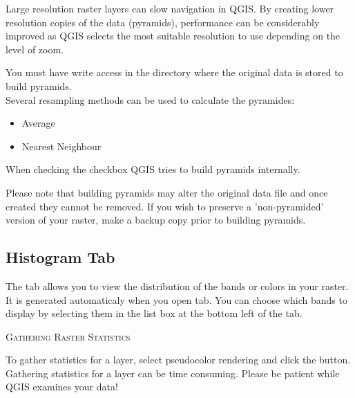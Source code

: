 Large resolution raster layers can slow navigation in QGIS. By creating lower
resolution copies of the data (pyramids), performance can be considerably
improved as QGIS selects the most suitable resolution to use depending on the
level of zoom.

You must have write access in the directory where the original data is stored
to build pyramids. \\
Several resampling methods can be used to calculate the pyramides:
\begin{itemize}[label=--]
\item Average
\item Nearest Neighbour
\end{itemize}

When checking the checkbox  QGIS tries to build pyramids internally.

Please note that building pyramids may alter the original data file and once
created they cannot be removed. If you wish to preserve a 'non-pyramided'
version of your raster, make a backup copy prior to building pyramids.

\subsection{Histogram Tab}\label{label_histogram}

The  tab allows you to view the distribution of the bands or colors in your raster. It is generated 
automaticaly when you open  tab. You can choose which bands to display by selecting them in the list box at the bottom left of the tab. 

%
%

\begin{Tip}\caption{\textsc{Gathering Raster Statistics}}
To gather statistics for a layer, select pseudocolor rendering and
click the  button. Gathering statistics for a layer can be time
consuming. Please be patient while QGIS examines your
data!
\end{Tip}

